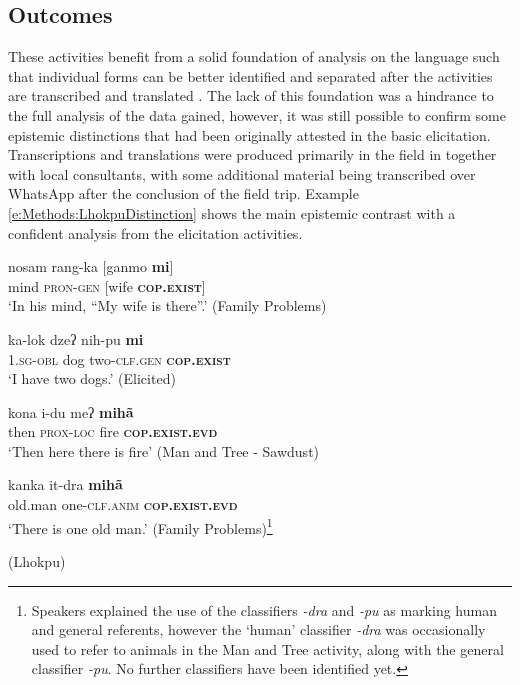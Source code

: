 \subsection{Outcomes}
These activities benefit from a solid foundation of analysis on the language such that individual forms can be better identified and separated after the activities are transcribed and translated \cite{Bodnaruk2023}. The lack of this foundation was a hindrance to the full analysis of the data gained, however, it was still possible to confirm some epistemic distinctions that had been originally attested in the basic elicitation. Transcriptions and translations were produced primarily in the field in  together with local consultants, with some additional material being transcribed over WhatsApp after the conclusion of the field trip. Example \ref{e:Methods:LhokpuDistinction} shows the main epistemic contrast with a confident analysis from the elicitation activities. 

\begin{exe}
  \ex\label{e:Methods:LhokpuDistinction}
  \begin{xlist}
    \ex\label{e:Methods:LhokpuDistinction:mi1}
    \gll nosam rang-ka [ganmo \textbf{mi}] \\
    mind \textsc{pron-gen} [wife \textbf{\textsc{cop.exist}}] \\
    \glt `In his mind, “My wife is there”.' (Family Problems)

    \ex \label{e:Methods:LhokpuDistinction:mi2}
    \gll ka-lok dzeʔ nih-pu \textbf{mi} \\
    \textsc{1.sg-obl} dog two-\textsc{clf.gen} \textbf{\textsc{cop.exist}} \\
    \glt `I have two dogs.' (Elicited)

    \ex \label{e:Methods:LhokpuDistinction:miha1}
    \gll kona i-du meʔ \textbf{mihã} \\
    then \textsc{prox-loc} fire \textbf{\textsc{cop.exist.evd}} \\
    \glt `Then here there is fire' (Man and Tree - Sawdust)

    \ex \label{e:Methods:LhokpuDistinction:miha2}
    \gll kanka it-dra \textbf{mihã} \\
    old.man one-\textsc{clf.anim}  \textbf{\textsc{cop.exist.evd}} \\
    \glt `There is one old man.' (Family Problems)\footnote{Speakers explained the use of the classifiers \textit{-dra} and \textit{-pu} as marking human and general referents, however the `human' classifier \textit{-dra} was occasionally used to refer to animals in the Man and Tree activity, along with the general classifier \textit{-pu}. No further classifiers have been identified yet.}
  \end{xlist}
  (Lhokpu)
\end{exe}

